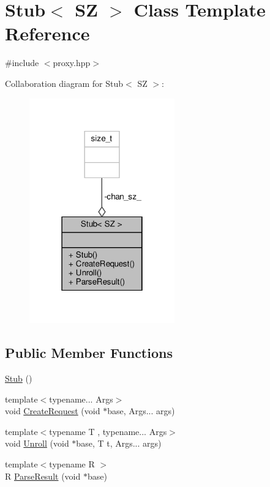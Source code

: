 \hypertarget{classStub}{}\section{Stub$<$ SZ $>$ Class Template Reference}
\label{classStub}


{\ttfamily \#include $<$proxy.\+hpp$>$}



Collaboration diagram for Stub$<$ SZ $>$\+:
\nopagebreak
\begin{figure}[H]
\begin{center}
\leavevmode
\includegraphics[width=178pt]{classStub__coll__graph}
\end{center}
\end{figure}
\subsection*{Public Member Functions}
\begin{DoxyCompactItemize}
\item 
\hyperlink{classStub_ae7629b6acb5ded1513e9ab73f293f93e}{Stub} ()
\item 
{\footnotesize template$<$typename... Args$>$ }\\void \hyperlink{classStub_ab83bdd8197df762e5763c2ef937ae0e5}{Create\+Request} (void $\ast$base, Args... args)
\item 
{\footnotesize template$<$typename T , typename... Args$>$ }\\void \hyperlink{classStub_aeaed7e40c227acf10dd0b82a8a5d0306}{Unroll} (void $\ast$base, T t, Args... args)
\item 
{\footnotesize template$<$typename R $>$ }\\R \hyperlink{classStub_a3eb7ab0bf78f5a7bb7668bc70e9dfc88}{Parse\+Result} (void $\ast$base)
\end{DoxyCompactItemize}
